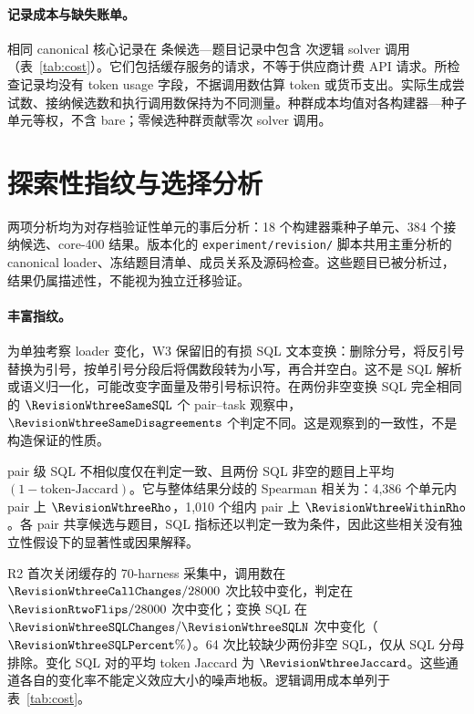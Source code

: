 \paragraph{记录成本与缺失账单。}相同 canonical 核心记录在 \RevisionCostRows{} 条候选—题目记录中包含 \RevisionLogicalCalls{} 次逻辑 solver 调用（表~\ref{tab:cost}）。它们包括缓存服务的请求，不等于供应商计费 API 请求。所检查记录均没有 token usage 字段，不据调用数估算 token 或货币支出。实际生成尝试数、接纳候选数和执行调用数保持为不同测量。种群成本均值对各构建器—种子单元等权，不含 bare；零候选种群贡献零次 solver 调用。
\begin{table}[t]\centering\small

\caption{core-400 canonical 描述性成本审核，每组 18 单元。逻辑调用不是计费请求或 token 数；末列为各单元候选种群每题调用数的均值。}\label{tab:cost}
\end{table}

\section{探索性指纹与选择分析}\label{app:rich}
两项分析均为对存档验证性单元的事后分析：18 个构建器乘种子单元、384 个接纳候选、core-400 结果。版本化的 \texttt{experiment/revision/} 脚本共用主重分析的 canonical loader、冻结题目清单、成员关系及源码检查。这些题目已被分析过，结果仍属描述性，不能视为独立迁移验证。
\paragraph{丰富指纹。}为单独考察 loader 变化，W3 保留旧的有损 SQL 文本变换：删除分号，将反引号替换为引号，按单引号分段后将偶数段转为小写，再合并空白。这不是 SQL 解析或语义归一化，可能改变字面量及带引号标识符。在两份非空变换 SQL 完全相同的 $\RevisionWthreeSameSQL$ 个 pair--task 观察中，$\RevisionWthreeSameDisagreements$ 个判定不同。这是观察到的一致性，不是构造保证的性质。

pair 级 SQL 不相似度仅在判定一致、且两份 SQL 非空的题目上平均 $(1-\text{token-Jaccard})$。它与整体结果分歧的 Spearman 相关为：4,386 个单元内 pair 上 $\RevisionWthreeRho$，1,010 个组内 pair 上 $\RevisionWthreeWithinRho$。各 pair 共享候选与题目，SQL 指标还以判定一致为条件，因此这些相关没有独立性假设下的显著性或因果解释。

R2 首次关闭缓存的 70-harness 采集中，调用数在 $\RevisionWthreeCallChanges/28000$ 次比较中变化，判定在 $\RevisionRtwoFlips/28000$ 次中变化；变换 SQL 在 $\RevisionWthreeSQLChanges/\RevisionWthreeSQLN$ 次中变化（$\RevisionWthreeSQLPercent\%$）。64 次比较缺少两份非空 SQL，仅从 SQL 分母排除。变化 SQL 对的平均 token Jaccard 为 $\RevisionWthreeJaccard$。这些通道各自的变化率不能定义效应大小的噪声地板。逻辑调用成本单列于表~\ref{tab:cost}。
